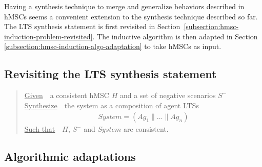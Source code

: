 Having a synthesis technique to merge and generalize behaviors described in hMSCs seems a convenient extension to the synthesis technique described so far. The LTS synthesis statement is first revisited in Section~\ref{subsection:hmsc-induction-problem-revisited}. The inductive algorithm is then adapted in Section \ref{subsection:hmsc-induction-algo-adaptation} to take hMSCs as input.

\subsection{Revisiting the LTS synthesis statement\label{subsection:hmsc-induction-problem-revisited}}

\begin{quote}
\underline{Given}~~a consistent hMSC $H$ and a set of negative scenarios $S^-$ 
\underline{Synthesize}~~the system as a composition of agent LTSs
\begin{align*}
System = (Ag_1 \parallel \ldots \parallel Ag_n)
\end{align*}
\underline{Such that}~~$H$, $S^-$ and $System$ are consistent.
\end{quote}


\subsection{Algorithmic adaptations\label{subsection:hmsc-induction-algo-adaptation}}

